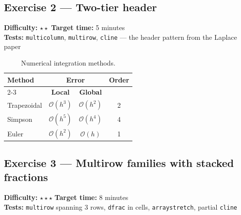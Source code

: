 \documentclass[11pt]{article}
\newcommand{\exinfo}[3]{%
  \par\noindent
  \colorbox{RoyalBlue!12}{\parbox{0.97\textwidth}{\small
  \textbf{Difficulty:} #1 \qquad \textbf{Target time:} #2 \\
  \textbf{Tests:} #3}}\par\medskip}
\begin{document}
\subsection*{Exercise 2 --- Two-tier header}
\exinfo{$\star\star$}{5 minutes}{\texttt{multicolumn}, \texttt{multirow},
\texttt{cline} --- the header pattern from the Laplace paper}

\begin{table}[H]
\centering
\caption{Numerical integration methods.}
\renewcommand{\arraystretch}{1.3}
\begin{tabular}{|l|c|c|c|}
\hline
\multirow{2}{*}{\textbf{Method}} & \multicolumn{2}{c|}{\textbf{Error}} &
  \multirow{2}{*}{\textbf{Order}} \\
\cline{2-3}
 & \textbf{Local} & \textbf{Global} & \\
\hline
Trapezoidal & $\mathcal{O}(h^3)$ & $\mathcal{O}(h^2)$ & 2 \\
\hline
Simpson     & $\mathcal{O}(h^5)$ & $\mathcal{O}(h^4)$ & 4 \\
\hline
Euler       & $\mathcal{O}(h^2)$ & $\mathcal{O}(h)$   & 1 \\
\hline
\end{tabular}
\end{table}

\subsection*{Exercise 3 --- Multirow families with stacked fractions}
\exinfo{$\star\star\star$}{8 minutes}{\texttt{multirow} spanning 3 rows,
\texttt{dfrac} in cells, \texttt{arraystretch}, partial \texttt{cline}}
\end{document}
